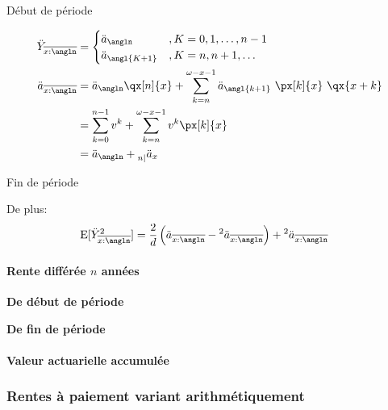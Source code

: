 \documentclass[10pt, french]{article}
\begin{document}
\begin{multicols*}{3}
\setlength{\mathindent}{-1cm}
\begin{minipage}[t]{0.5\columnwidth}
\begin{center}
Début de période
\end{center}
\begin{align*}
\ddot{Y}_{\overline{x:\angln}} 
	&= 	\begin{cases}
			\ddot{a}_{\angln}			& , K = 0, 1, \dots, n - 1 \\
			\ddot{a}_{\angl{K + 1}}		& , K = n, n + 1, \dots \\
		\end{cases} \\
	\ddot{a}_{\overline{x:\angln}}	
	&=	\ddot{a}_{\angln} \qx[n]{x} + \sum_{k = n}^{\omega - x - 1} \ddot{a}_{\angl{k + 1}} \ \px[k]{x} \ \qx{x + k}	\\
	&=	\sum_{k = 0}^{n - 1} v^{k} + \sum_{k = n}^{\omega - x - 1} v^{k} \px[k]{x}	\\
	&=	\ddot{a}_{\angln} + \prescript{}{n|}{\ddot{a}_{x}}
\end{align*}
\end{minipage}
\begin{minipage}[t]{0.5\columnwidth}
\begin{center}
Fin de période
\end{center}
\end{minipage}
\setlength{\mathindent}{1cm}

De plus:
\begin{align*}
	\text{E}[\ddot{Y}_{\overline{x:\angln}}^{2}]	
	&=	\frac{2}{d} \left(\ddot{a}_{\overline{x:\angln}} - \prescript{2}{}{\ddot{a}_{\overline{x:\angln}}}\right) + \prescript{2}{}{\ddot{a}_{\overline{x:\angln}}}
\end{align*}


\paragraph{Rente différée $n$ années}

\textbf{De début de période}

\textbf{De fin de période}

\paragraph{Valeur actuarielle accumulée}

\subsubsection*{\textcolor{amber(sae/ece)}{Rentes à paiement variant arithmétiquement}}


\end{multicols*}
\end{document}
